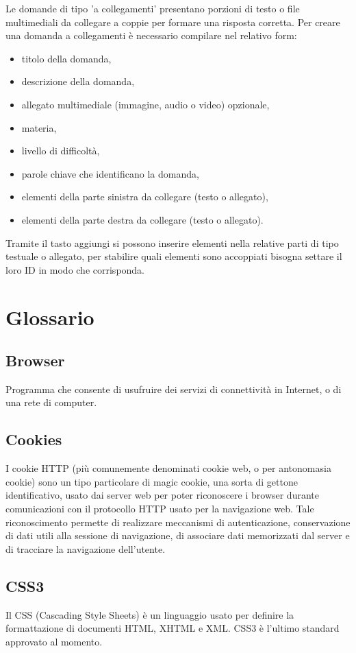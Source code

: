 \documentclass[a4paper, titlepage]{article}
\begin{document}
	 Le domande di tipo 'a collegamenti' presentano porzioni di testo o file multimediali da collegare a coppie per formare una risposta corretta.
	 Per creare una domanda a collegamenti è necessario compilare nel relativo form:
	 \begin{itemize}
	 	\item titolo della domanda,
	 	\item descrizione della domanda,
	 	\item allegato multimediale (immagine, audio o video) opzionale,
	 	\item materia,
	 	\item livello di difficoltà,
	 	\item parole chiave che identificano la domanda,
	 	\item elementi della parte sinistra da collegare (testo o allegato),
	 	\item elementi della parte destra da collegare (testo o allegato).
	 \end{itemize}
	 Tramite il tasto aggiungi si possono inserire elementi nella relative parti di tipo testuale o allegato, per stabilire quali elementi sono accoppiati bisogna settare il loro ID in modo che corrisponda.
	 
	 \section{Glossario}
	 \label{gl} 
	 
	 \subsection{Browser}
	 Programma che consente di usufruire dei servizi di connettività in Internet, o di una rete di computer.
	 
	 \subsection{Cookies}
	 I cookie HTTP (più comunemente denominati cookie web, o per antonomasia cookie) sono un tipo
	 particolare di magic cookie, una sorta di gettone identificativo, usato dai server web per poter
	 riconoscere i browser durante comunicazioni con il protocollo HTTP usato per la navigazione web.
	 Tale riconoscimento permette di realizzare meccanismi di autenticazione, conservazione di dati utili
	 alla sessione di navigazione, di associare dati memorizzati dal server e di tracciare la navigazione dell’utente.
	 
	 \subsection{CSS3}
	 Il CSS (Cascading Style Sheets) è un linguaggio usato per definire la formattazione di documenti HTML, XHTML e XML. CSS3 è l’ultimo standard approvato al momento.
\end{document}
